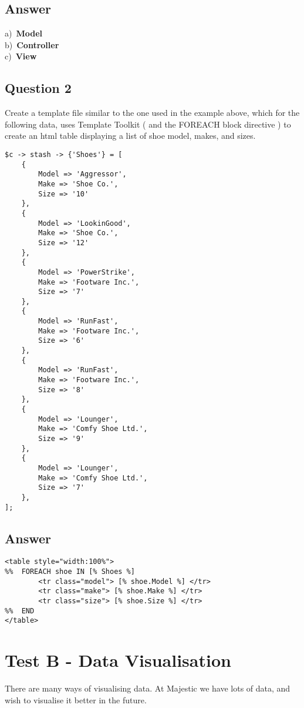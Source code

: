 \documentclass{article}
\begin{document}
\subsection{Answer}
a)\ \textbf{Model}\\
b)\ \textbf{Controller}\\
c)\ \textbf{View}\\
\subsection{Question 2}
Create a template file similar to the one used in the example above, which for the following data, uses Template Toolkit ( and the FOREACH block directive ) to create an html table displaying a list of shoe model, makes, and sizes.
\newpage
\begin{lstlisting}
$c -> stash -> {'Shoes'} = [
    {
        Model => 'Aggressor',
        Make => 'Shoe Co.',
        Size => '10'
    },
    {
        Model => 'LookinGood',
        Make => 'Shoe Co.',
        Size => '12'
    },
    {
        Model => 'PowerStrike',
        Make => 'Footware Inc.',
        Size => '7'
    },
    {
        Model => 'RunFast',
        Make => 'Footware Inc.',
        Size => '6'
    },
    {
        Model => 'RunFast',
        Make => 'Footware Inc.',
        Size => '8'
    },
    {
        Model => 'Lounger',
        Make => 'Comfy Shoe Ltd.',
        Size => '9'
    },
    {
        Model => 'Lounger',
        Make => 'Comfy Shoe Ltd.',
        Size => '7'
    },
];
\end{lstlisting}
\subsection{Answer}
\begin{lstlisting}
<table style="width:100%">
%%  FOREACH shoe IN [% Shoes %]   
        <tr class="model"> [% shoe.Model %] </tr>
        <tr class="make"> [% shoe.Make %] </tr>
        <tr class="size"> [% shoe.Size %] </tr>
%%  END
</table> 
\end{lstlisting}
\newpage
\section{Test B - Data Visualisation}
There are many ways of visualising data. At Majestic we have lots of data, and wish to visualise it better in the future. \\
\end{document}
